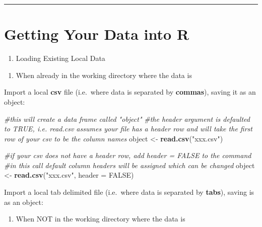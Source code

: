 \documentclass[]{book}
\newenvironment{Shaded}{\begin{snugshade}}{\end{snugshade}}
\newcommand{\CommentTok}[1]{\textcolor[rgb]{0.56,0.35,0.01}{\textit{#1}}}
\newcommand{\DataTypeTok}[1]{\textcolor[rgb]{0.13,0.29,0.53}{#1}}
\newcommand{\KeywordTok}[1]{\textcolor[rgb]{0.13,0.29,0.53}{\textbf{#1}}}
\newcommand{\NormalTok}[1]{#1}
\newcommand{\OtherTok}[1]{\textcolor[rgb]{0.56,0.35,0.01}{#1}}
\newcommand{\StringTok}[1]{\textcolor[rgb]{0.31,0.60,0.02}{#1}}
\providecommand{\tightlist}{%
  \setlength{\itemsep}{0pt}\setlength{\parskip}{0pt}}
\begin{document}
\begin{center}\rule{0.5\linewidth}{0.5pt}\end{center}

\hypertarget{getting-your-data-into-r}{%
\section{Getting Your Data into R}\label{getting-your-data-into-r}}

\begin{enumerate}
\def\labelenumi{\arabic{enumi}.}
\tightlist
\item
  Loading Existing Local Data
\end{enumerate}

\begin{enumerate}
\def\labelenumi{(\alph{enumi})}
\tightlist
\item
  When already in the working directory where the data is
\end{enumerate}

Import a local \textbf{csv} file (i.e.~where data is separated by \textbf{commas}), saving it as an object:

\begin{Shaded}
\begin{Highlighting}[]
\CommentTok{#this will create a data frame called "object"}
\CommentTok{#the header argument is defaulted to TRUE, i.e. read.csv assumes your file has a header row and will take the first row of your csv to be the column names}
\NormalTok{object <-}\StringTok{ }\KeywordTok{read.csv}\NormalTok{(}\StringTok{"xxx.csv"}\NormalTok{)}

\CommentTok{#if your csv does not have a header row, add header = FALSE to the command}
\CommentTok{#in this call default column headers will be assigned which can be changed}
\NormalTok{object <-}\StringTok{ }\KeywordTok{read.csv}\NormalTok{(}\StringTok{"xxx.csv"}\NormalTok{, }\DataTypeTok{header =} \OtherTok{FALSE}\NormalTok{)}
\end{Highlighting}
\end{Shaded}

Import a local tab delimited file (i.e.~where data is separated by \textbf{tabs}), saving is as an object:

\begin{enumerate}
\def\labelenumi{(\alph{enumi})}
\setcounter{enumi}{1}
\tightlist
\item
  When NOT in the working directory where the data is
\end{enumerate}
\end{document}
